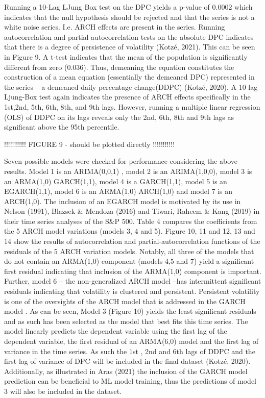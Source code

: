 \documentclass[11pt,preprint, authoryear]{elsarticle}
\numberwithin{equation}{section}
\numberwithin{figure}{section}
\numberwithin{table}{section}
\begin{document}
Running a 10-Lag LJung Box test on the DPC yields a p-value of 0.0002
which indicates that the null hypothesis should be rejected and that the
series is not a white noise series. I.e. ARCH effects are present in the
series. Running autocorrelation and partial-autocorrelation tests on the
absolute DPC indicates that there is a degree of persistence of
volatility (Kotzé, 2021). This can be seen in Figure 9. A t-test
indicates that the mean of the population is significantly different
from zero (0.036). Thus, demeaning the equation constitutes the
construction of a mean equation (essentially the demeaned DPC)
represented in the series -- a demeaned daily percentage change(DDPC)
(Kotzé, 2020). A 10 lag Ljung-Box test again indicates the presence of
ARCH effects specifically in the 1st,2nd, 5th, 6th, 8th, and 9th lags.
However, running a multiple linear regression (OLS) of DDPC on its lags
reveals only the 2nd, 6th, 8th and 9th lags as significant above the
95th percentile.

!!!!!!!!!!! FIGURE 9 - should be plotted directly !!!!!!!!!!!

Seven possible models were checked for performance considering the above
results. Model 1 is an ARIMA(0,0,1) , model 2 is an ARIMA(1,0,0), model
3 is an ARMA(1,0) GARCH(1,1), model 4 is a GARCH(1,1), model 5 is an
EGARCH(1,1), model 6 is an ARMA(1,0) ARCH(1,0) and model 7 is an
ARCH(1,0). The inclusion of an EGARCH model is motivated by its use in
Nelson (1991), Blazsek \& Mendoza (2016) and Tiwari, Raheem \& Kang
(2019) in their time series analyses of the S\&P 500. Table 4 compares
the coefficients from the 5 ARCH model variations (models 3, 4 and 5).
Figure 10, 11 and 12, 13 and 14 show the results of autocorrelation and
partial-autocorrelation functions of the residuals of the 5 ARCH
variation models. Notably, all three of the models that do not contain
an ARMA(1,0) component (models 4,5 and 7) yield a significant first
residual indicating that inclusion of the ARMA(1,0) component is
important. Further, model 6 -- the non-generalized ARCH model --has
intermittent significant residuals indicating that volatility is
clustered and persistent. Persistent volatility is one of the oversights
of the ARCH model that is addressed in the GARCH model . As can be seen,
Model 3 (Figure 10) yields the least significant residuals and as such
has been selected as the model that best fits this time series. The
model linearly predicts the dependent variable using the first lag of
the dependent variable, the first residual of an ARMA(6,0) model and the
first lag of variance in the time series. As such the 1st , 2nd and 6th
lags of DDPC and the first lag of variance of DPC will be included in
the final dataset (Kotzé, 2020). Additionally, as illustrated in Aras
(2021) the inclusion of the GARCH model prediction can be beneficial to
ML model training, thus the predictions of model 3 will also be included
in the dataset.
\end{document}
